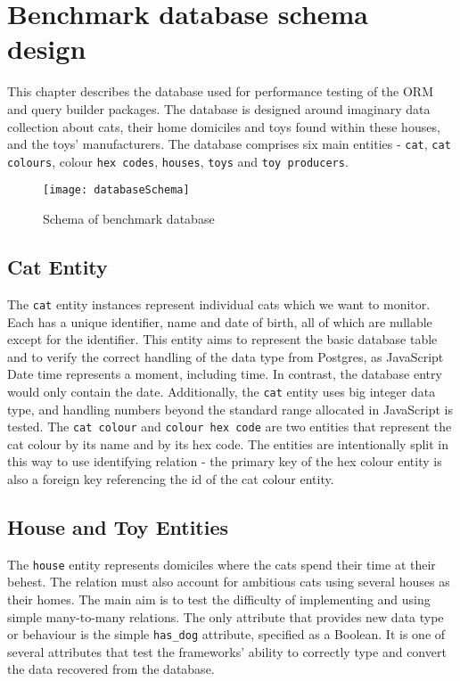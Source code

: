 \chapter{Benchmark database schema design}\label{ch:database}

This chapter describes the database used for performance testing of the ORM and
query builder packages. The database is designed around imaginary data
collection about cats, their home domiciles and toys found within these houses,
and the toys' manufacturers. The database comprises six main entities -
\texttt{cat}, \texttt{cat colours}, colour \texttt{hex codes}, \texttt{houses},
\texttt{toys} and \texttt{toy producers}.

\begin{figure}[b]
    \caption{Schema of benchmark database}
    \centering
    \texttt{[image: databaseSchema]}
\end{figure}

\section{Cat Entity}
The \texttt{cat} entity instances represent individual cats which we want to
monitor. Each has a unique identifier, name and date of birth, all of which are
nullable except for the identifier. This entity aims to represent the basic
database table and to verify the correct handling of the data type from
Postgres, as JavaScript Date time represents a moment, including time. In
contrast, the database entry would only contain the date. Additionally, the
\texttt{cat} entity uses big integer data type, and handling numbers beyond the
standard range allocated in JavaScript is tested. The \texttt{cat colour} and
\texttt{colour hex code} are two entities that represent the cat colour by its
name and by its hex code. The entities are intentionally split in this way to
use identifying relation - the primary key of the hex colour entity is also a
foreign key referencing the id of the cat colour entity.

\section{House and Toy Entities}
The \texttt{house} entity represents domiciles where the cats spend their time
at their behest. The relation must also account for ambitious cats using several
houses as their homes. The main aim is to test the difficulty of implementing
and using simple many-to-many relations. The only attribute that provides new
data type or behaviour is the simple \verb|has_dog| attribute, specified as a
Boolean. It is one of several attributes that test the frameworks' ability to
correctly type and convert the data recovered from the database.

